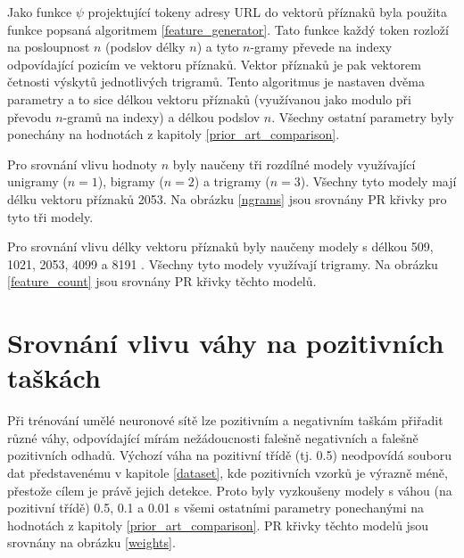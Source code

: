 Jako funkce \( \psi \) projektující tokeny adresy URL do vektorů příznaků byla použita funkce popsaná algoritmem \ref{feature_generator}. Tato funkce každý token rozloží na posloupnost \( n \) (podslov délky \( n \)) a tyto \( n \)-gramy převede na indexy odpovídající pozicím ve vektoru příznaků. Vektor příznaků je pak vektorem četnosti výskytů jednotlivých trigramů. Tento algoritmus je nastaven dvěma parametry a to sice délkou vektoru příznaků (využívanou jako modulo při převodu \( n \)-gramů na indexy) a délkou podslov \( n \). Všechny ostatní parametry byly ponechány na hodnotách z kapitoly \ref{prior_art_comparison}.

Pro srovnání vlivu hodnoty \( n \) byly naučeny tři rozdílné modely využívající unigramy (\( n = 1 \)), bigramy (\( n = 2 \))  a trigramy (\( n = 3 \)). Všechny tyto modely mají délku vektoru příznaků 2053. Na obrázku \ref{ngrams} jsou srovnány PR křivky pro tyto tři modely.


Pro srovnání vlivu délky vektoru příznaků byly naučeny modely s délkou 509, 1021, 2053, 4099 a 8191 . Všechny tyto modely využívají trigramy. Na obrázku \ref{feature_count} jsou srovnány PR křivky těchto modelů.


\section{Srovnání vlivu váhy na pozitivních taškách}
Při trénování umělé neuronové sítě lze pozitivním a negativním taškám přiřadit různé váhy, odpovídající mírám nežádoucnosti falešně negativních a falešně pozitivních odhadů. Výchozí váha na pozitivní třídě (tj. 0.5) neodpovídá souboru dat představenému v kapitole \ref{dataset}, kde pozitivních vzorků je výrazně méně, přestože cílem je právě jejich detekce. Proto byly vyzkoušeny modely s váhou (na pozitivní třídě) 0.5, 0.1 a 0.01 s všemi ostatními parametry ponechanými na hodnotách z kapitoly \ref{prior_art_comparison}. PR křivky těchto modelů jsou srovnány na obrázku \ref{weights}.


